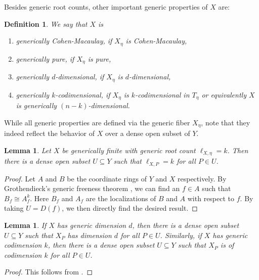 \documentclass[12pt,reqno,a4paper]{amsart}
\theoremstyle{theoremstyle}
\newtheorem{lemma}[theorem]{Lemma}
\theoremstyle{examplestyle}
\newtheorem{definition}[theorem]{Definition}
\theoremstyle{algorithmstyle}
\begin{document}
Besides generic root counts, other important generic properties of $X$ are:

\begin{definition}
  \label{def:genericProperties}
  We say that $X$ is
  \begin{enumerate}
  \item \emph{generically Cohen-Macaulay}, if $X_\eta$ is Cohen-Macaulay,
  \item \emph{generically pure}, if $X_\eta$ is pure,
  \item \emph{generically $d$-dimensional}, if $X_\eta$ is $d$-dimensional,
  \item \emph{generically $k$-codimensional}, if $X_\eta$ is $k$-codimensional in $T_\eta$ or equivalently $X$ is generically $(n-k)$-dimensional.
  \end{enumerate}
\end{definition}


While all generic properties are defined via the generic fiber $X_\eta$, note that they indeed reflect the behavior of $X$ over a dense open subset of $Y$.

\begin{lemma}
  \label{lem:genericRootCount}
  Let $X$ be generically finite with generic root count $\ell_{X,\eta}=k$. Then there is a dense open subset $U\subseteq Y$ such that $\ell_{X,P}=k$ for all $P\in{U}$.
\end{lemma}
\begin{proof}
  Let $A$ and $B$ be the coordinate rings of $Y$ and $X$ respectively. By Grothendieck's generic freeness theorem \cite[\href{https://stacks.math.columbia.edu/tag/051S}{Lemma 051S}]{stacks-project}, we can find an $f\in{A}$ such that $B_{f}\cong A^{k}_{f}$. Here $B_{f}$ and $A_{f}$ are the localizations of $B$ and $A$ with respect to $f$. By taking $U=D(f)$, we then directly find the desired result.
\end{proof}

\begin{lemma}\label{lem:GenericDimensions}
  If $X$ has generic dimension $d$, then there is a dense open subset $U\subseteq Y$ such that $X_P$ has dimension $d$ for all $P\in U$. Similarly, if $X$ has generic codimension $k$, then there is a dense open subset $U\subseteq Y$ such that $X_P$ is of codimension $k$ for all $P\in U$.
\end{lemma}
\begin{proof}
    This follows from \cite[\href{https://stacks.math.columbia.edu/tag/05F7}{Lemma 05F7}]{stacks-project}.
\end{proof}
\end{document}

